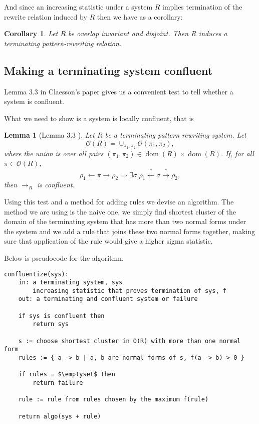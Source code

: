 \documentclass[a4paper, 11pt, english]{article}
\newtheorem{lemma}[theorem]{Lemma}
\newtheorem{corollary}[theorem]{Corollary}
\theoremstyle{definition}
\newcommand{\Ocal}{\mathcal{O}}
\newcommand{\from}{\leftarrow}
\newcommand{\tostar}{\stackrel{*}{\to}}
\newcommand{\fromstar}{\stackrel{*}{\from}}
\DeclareMathOperator{\dom}{dom}
\begin{document}
And since an increasing statistic under a system $R$ implies termination of the rewrite relation
induced by $R$ then we have as a corollary:

\begin{corollary}
    Let $R$ be overlap invariant and disjoint. Then $R$ induces a terminating pattern-rewriting relation.
\end{corollary}

\subsection{Making a terminating system confluent}
Lemma $3.3$ in Claesson's paper gives us a convenient test to tell whether a system is
confluent. 

What we need to show is a system is locally confluent, that is
\begin{lemma}[Lemma 3.3 \cite{claesson:2021}]
    Let $R$ be a terminating pattern rewriting system. Let 
    \begin{equation*}
        \Ocal(R) = \cup_{\pi_1, \pi_2} \Ocal(\pi_1, \pi_2),
    \end{equation*}
    where the union is over all pairs $(\pi_1, \pi_2) \in \dom(R) \times \dom(R)$. If, for all
    $\pi \in \Ocal(R)$,
    \begin{equation*}
        \rho_1 \from \pi \to \rho_2 \Longrightarrow \exists \sigma. \rho_1 \fromstar \sigma \tostar
        \rho_2,
    \end{equation*}
    then $\to_R$ is confluent.
        
\end{lemma}

Using this test and a method for adding rules we devise an algorithm. The method we are using is the
naive one, we simply find shortest cluster of the domain of the terminating system that has more than two
normal forms under the system and we add a rule that joins these two normal forms together, making
sure that application of the rule would give a higher sigma statistic.

Below is pseudocode for the algorithm.

\lstset{basicstyle=\footnotesize\ttfamily, frame=single, breaklines=true,
mathescape=true}
\begin{minipage}{\linewidth}
\begin{lstlisting}[title={Algorithm 1}]
confluentize(sys):
    in: a terminating system, sys
        increasing statistic that proves termination of sys, f
    out: a terminating and confluent system or failure

    if sys is confluent then
        return sys

    s := choose shortest cluster in O(R) with more than one normal form
    rules := { a -> b | a, b are normal forms of s, f(a -> b) > 0 }

    if rules = $\emptyset$ then
        return failure

    rule := rule from rules chosen by the maximum f(rule)

    return algo(sys + rule)
\end{lstlisting}
\end{minipage}
\end{document}
